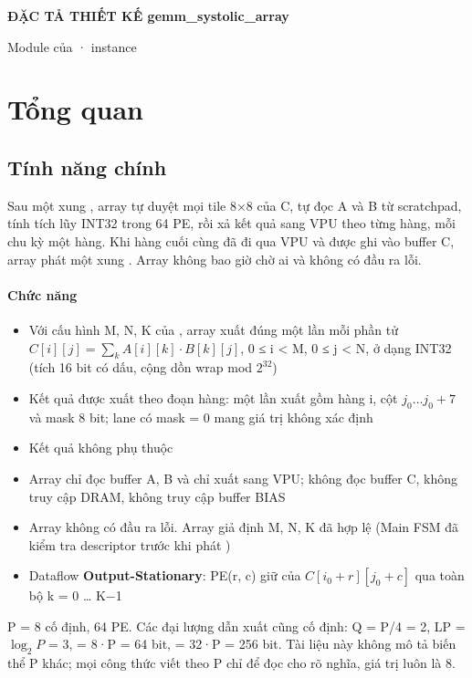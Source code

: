 \documentclass[10pt,a4paper]{article}
\begin{document}
{\Large\bfseries ĐẶC TẢ THIẾT KẾ gemm\_systolic\_array}\par
\vspace{2pt}
{\small\color{muted}Module của  · instance }\par
\tableofcontents
\clearpage

\section{Tổng quan}
\subsection{Tính năng chính}\label{sec:1}

Sau một xung , array tự duyệt mọi tile 8×8 của C, tự đọc A và B từ scratchpad, tính tích lũy INT32 trong 64 PE, rồi xả kết quả sang VPU theo từng hàng, mỗi chu kỳ một hàng. Khi hàng cuối cùng đã đi qua VPU và được ghi vào buffer C, array phát một xung . Array không bao giờ chờ ai và không có đầu ra lỗi.

\paragraph{Chức năng}\label{par:1-1}
\begin{itemize}
\item Với cấu hình M, N, K của , array xuất đúng một lần mỗi phần tử $C[i][j] = \sum_{k} A[i][k]\cdot B[k][j]$, 0 ≤ i < M, 0 ≤ j < N, ở dạng INT32 (tích 16 bit có dấu, cộng dồn wrap mod $2^{32}$)
\item Kết quả được xuất theo đoạn hàng: một lần xuất gồm hàng i, cột $j_0 … j_0+7$ và mask 8 bit; lane có mask = 0 mang giá trị không xác định
\item Kết quả không phụ thuộc 
\item Array chỉ đọc buffer A, B và chỉ xuất sang VPU; không đọc buffer C, không truy cập DRAM, không truy cập buffer BIAS
\item Array không có đầu ra lỗi. Array giả định M, N, K đã hợp lệ (Main FSM đã kiểm tra descriptor trước khi phát )
\item Dataflow \textbf{Output-Stationary}: PE(r, c) giữ  của $C[i_0+r][j_0+c]$ qua toàn bộ k = 0 … K−1
\end{itemize}

\begin{notebox}
P = 8 cố định, 64 PE. Các đại lượng dẫn xuất cũng cố định: Q = P/4 = 2, LP = $\log_2 P$ = 3,  = 8·P = 64 bit,  = 32·P = 256 bit. Tài liệu này không mô tả biến thể P khác; mọi công thức viết theo P chỉ để đọc cho rõ nghĩa, giá trị luôn là 8.
\end{notebox}
\end{document}

